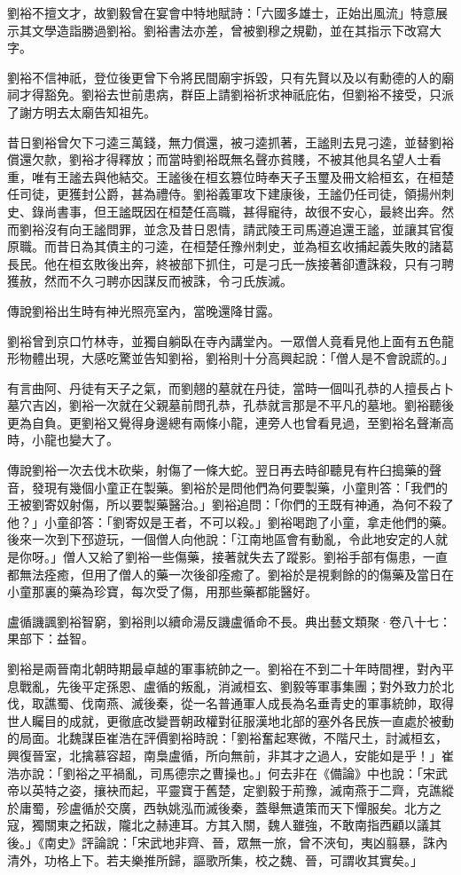 劉裕不擅文才，故劉毅曾在宴會中特地賦詩：「六國多雄士，正始出風流」特意展示其文學造詣勝過劉裕。劉裕書法亦差，曾被劉穆之規勸，並在其指示下改寫大字。

劉裕不信神祇，登位後更曾下令將民間廟宇拆毀，只有先賢以及以有勳德的人的廟祠才得豁免。劉裕去世前患病，群臣上請劉裕祈求神祇庇佑，但劉裕不接受，只派了謝方明去太廟告知祖先。

昔日劉裕曾欠下刁逵三萬錢，無力償還，被刁逵抓著，王謐則去見刁逵，並替劉裕償還欠款，劉裕才得釋放；而當時劉裕既無名聲亦貧賤，不被其他具名望人士看重，唯有王謐去與他結交。王謐後在桓玄篡位時奉天子玉璽及冊文給桓玄，在桓楚任司徒，更獲封公爵，甚為禮侍。劉裕義軍攻下建康後，王謐仍任司徒，領揚州刺史、錄尚書事，但王謐既因在桓楚任高職，甚得寵待，故很不安心，最終出奔。然而劉裕沒有向王謐問罪，並念及昔日恩情，請武陵王司馬遵追還王謐，並讓其官復原職。而昔日為其債主的刁逵，在桓楚任豫州刺史，並為桓玄收捕起義失敗的諸葛長民。他在桓玄敗後出奔，終被部下抓住，可是刁氏一族接著卻遭誅殺，只有刁聘獲赦，然而不久刁聘亦因謀反而被誅，令刁氏族滅。

傳說劉裕出生時有神光照亮室內，當晚還降甘露。

劉裕曾到京口竹林寺，並獨自躺臥在寺內講堂內。一眾僧人竟看見他上面有五色龍形物體出現，大感吃驚並告知劉裕，劉裕則十分高興起說：「僧人是不會說謊的。」

有言曲阿、丹徒有天子之氣，而劉翹的墓就在丹徒，當時一個叫孔恭的人擅長占卜墓穴吉凶，劉裕一次就在父親墓前問孔恭，孔恭就言那是不平凡的墓地。劉裕聽後更為自負。更劉裕又覺得身邊總有兩條小龍，連旁人也曾看見過，至劉裕名聲漸高時，小龍也變大了。

傳說劉裕一次去伐木砍柴，射傷了一條大蛇。翌日再去時卻聽見有杵臼搗藥的聲音，發現有幾個小童正在製藥。劉裕於是問他們為何要製藥，小童則答：「我們的王被劉寄奴射傷，所以要製藥醫治。」劉裕追問：「你們的王既有神通，為何不殺了他？」小童卻答：「劉寄奴是王者，不可以殺。」劉裕喝跑了小童，拿走他們的藥。後來一次到下邳遊玩，一個僧人向他說：「江南地區會有動亂，令此地安定的人就是你呀。」僧人又給了劉裕一些傷藥，接著就失去了蹤影。劉裕手部有傷患，一直都無法痊癒，但用了僧人的藥一次後卻痊癒了。劉裕於是視剩餘的的傷藥及當日在小童那裏的藥為珍寶，每次受了傷，用那些藥都能醫好。

盧循譏諷劉裕智窮，劉裕則以續命湯反譏盧循命不長。典出藝文類聚·卷八十七：果部下：益智。

劉裕是兩晉南北朝時期最卓越的軍事統帥之一。劉裕在不到二十年時間裡，對內平息戰亂，先後平定孫恩、盧循的叛亂，消滅桓玄、劉毅等軍事集團；對外致力於北伐，取譙蜀、伐南燕、滅後秦，從一名普通軍人成長為名垂青史的軍事統帥，取得世人矚目的成就，更徹底改變晋朝政權對征服漢地北部的塞外各民族一直處於被動的局面。北魏謀臣崔浩在評價劉裕時說：「劉裕奮起寒微，不階尺土，討滅桓玄，興復晉室，北擒慕容超，南梟盧循，所向無前，非其才之過人，安能如是乎！」崔浩亦說：「劉裕之平禍亂，司馬德宗之曹操也。」何去非在《備論》中也說：「宋武帝以英特之姿，攘袂而起，平靈寶于舊楚，定劉毅于荊豫，滅南燕于二齊，克譙縱於庸蜀，殄盧循於交廣，西執姚泓而滅後秦，蓋舉無遺策而天下憚服矣。北方之寇，獨關東之拓跋，隴北之赫連耳。方其入關，魏人雖強，不敢南指西顧以議其後。」《南史》評論說：「宋武地非齊、晉，眾無一旅，曾不浹旬，夷凶翦暴，誅內清外，功格上下。若夫樂推所歸，謳歌所集，校之魏、晉，可謂收其實矣。」

